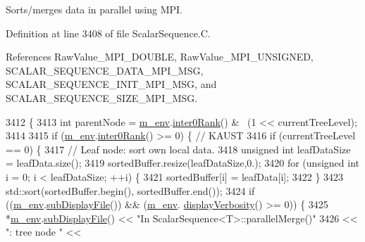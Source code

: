 Sorts/merges data in parallel using M\-P\-I. 



Definition at line 3408 of file Scalar\-Sequence.\-C.



References Raw\-Value\-\_\-\-M\-P\-I\-\_\-\-D\-O\-U\-B\-L\-E, Raw\-Value\-\_\-\-M\-P\-I\-\_\-\-U\-N\-S\-I\-G\-N\-E\-D, S\-C\-A\-L\-A\-R\-\_\-\-S\-E\-Q\-U\-E\-N\-C\-E\-\_\-\-D\-A\-T\-A\-\_\-\-M\-P\-I\-\_\-\-M\-S\-G, S\-C\-A\-L\-A\-R\-\_\-\-S\-E\-Q\-U\-E\-N\-C\-E\-\_\-\-I\-N\-I\-T\-\_\-\-M\-P\-I\-\_\-\-M\-S\-G, and S\-C\-A\-L\-A\-R\-\_\-\-S\-E\-Q\-U\-E\-N\-C\-E\-\_\-\-S\-I\-Z\-E\-\_\-\-M\-P\-I\-\_\-\-M\-S\-G.


\begin{DoxyCode}
3412 \{
3413   \textcolor{keywordtype}{int} parentNode = \hyperlink{class_q_u_e_s_o_1_1_scalar_sequence_a71618cd6351b29361b437af68447a4c8}{m\_env}.\hyperlink{class_q_u_e_s_o_1_1_base_environment_ae106b5bb8a80b655b88b3a26b1e7c185}{inter0Rank}() & ~(1 << currentTreeLevel);
3414 
3415   \textcolor{keywordflow}{if} (\hyperlink{class_q_u_e_s_o_1_1_scalar_sequence_a71618cd6351b29361b437af68447a4c8}{m\_env}.\hyperlink{class_q_u_e_s_o_1_1_base_environment_ae106b5bb8a80b655b88b3a26b1e7c185}{inter0Rank}() >= 0) \{ \textcolor{comment}{// KAUST}
3416   \textcolor{keywordflow}{if} (currentTreeLevel == 0) \{
3417     \textcolor{comment}{// Leaf node: sort own local data.}
3418     \textcolor{keywordtype}{unsigned} \textcolor{keywordtype}{int} leafDataSize = leafData.size();
3419     sortedBuffer.resize(leafDataSize,0.);
3420     \textcolor{keywordflow}{for} (\textcolor{keywordtype}{unsigned} \textcolor{keywordtype}{int} i = 0; i < leafDataSize; ++i) \{
3421       sortedBuffer[i] = leafData[i];
3422     \}
3423     std::sort(sortedBuffer.begin(), sortedBuffer.end());
3424     \textcolor{keywordflow}{if} ((\hyperlink{class_q_u_e_s_o_1_1_scalar_sequence_a71618cd6351b29361b437af68447a4c8}{m\_env}.\hyperlink{class_q_u_e_s_o_1_1_base_environment_a8a0064746ae8dddfece4229b9ad374d6}{subDisplayFile}()) && (\hyperlink{class_q_u_e_s_o_1_1_scalar_sequence_a71618cd6351b29361b437af68447a4c8}{m\_env}.
      \hyperlink{class_q_u_e_s_o_1_1_base_environment_a1fe5f244fc0316a0ab3e37463f108b96}{displayVerbosity}() >= 0)) \{
3425       *\hyperlink{class_q_u_e_s_o_1_1_scalar_sequence_a71618cd6351b29361b437af68447a4c8}{m\_env}.\hyperlink{class_q_u_e_s_o_1_1_base_environment_a8a0064746ae8dddfece4229b9ad374d6}{subDisplayFile}() << \textcolor{stringliteral}{"In ScalarSequence<T>::parallelMerge()"}
3426                               << \textcolor{stringliteral}{": tree node "}                                            << 

\end{DoxyCode}
